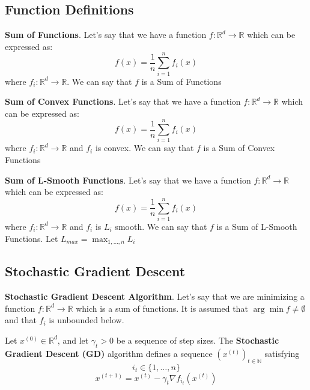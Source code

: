 \subsection{Function Definitions}
\noindent \textbf{Sum of Functions}. Let's say that we have a function $f: \mathbb{R}^d \rightarrow \mathbb{R}$ which can be expressed as: 
\begin{equation}
    f(x) = \frac{1}{n} \sum_{i=1}^{n} f_i(x)
\end{equation}
where $f_i: \mathbb{R}^d \rightarrow \mathbb{R}$. We can say that $f$ is a Sum of Functions

\noindent \textbf{Sum of Convex Functions}. Let's say that we have a function $f: \mathbb{R}^d \rightarrow \mathbb{R}$ which can be expressed as: 
\begin{equation}
    f(x) = \frac{1}{n} \sum_{i=1}^{n} f_i(x)
\end{equation}
where $f_i: \mathbb{R}^d \rightarrow \mathbb{R}$ and $f_i$ is convex. We can say that $f$ is a Sum of Convex Functions

\noindent \textbf{Sum of L-Smooth Functions}. Let's say that we have a function $f: \mathbb{R}^d \rightarrow \mathbb{R}$ which can be expressed as: 
\begin{equation}
    f(x) = \frac{1}{n} \sum_{i=1}^{n} f_i(x)
\end{equation}
where $f_i: \mathbb{R}^d \rightarrow \mathbb{R}$ and $f_i$ is $L_i$ smooth. We can say that $f$ is a Sum of L-Smooth Functions. Let $L_{max} = \max_{1, \dots, n} L_i$

\subsection{Stochastic Gradient Descent}
\noindent \textbf{Stochastic Gradient Descent Algorithm}. Let's say that we are minimizing a function $f: \mathbb{R}^d \rightarrow \mathbb{R}$ which is a sum of functions. It is assumed that $\arg \min f \neq \emptyset$ and that $f_i$ is unbounded below.  

\noindent Let $x^{(0)} \in \mathbb{R}^d$, and let $\gamma_t > 0$ be a sequence of step sizes. The \textbf{Stochastic Gradient Descent (GD)} algorithm defines a sequence $(x^{(t)})_{t \in \mathbb{N}}$ satisfying 
\begin{equation}
    i_t \in \{1, \dots, n\}
\end{equation}
\begin{equation}
    x^{(t + 1)}  = x^{(t)} - \gamma_t \nabla f_{i_t}(x^{(t)})
\end{equation}

